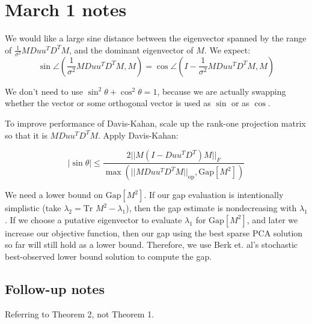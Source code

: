 \documentclass{article}
\begin{document}
\section{March 1 notes}

We would like a large sine distance between the eigenvector spanned by the range of $\frac{1}{\sigma^2} MDuu^T D^T M$, and the dominant eigenvector of $M$. We expect: $$\sin \angle(\frac{1}{\sigma^2} MDuu^T D^T M, M) = \cos \angle (I-\frac{1}{\sigma^2} MDuu^T D^T M, M)$$

We don't need to use $\sin^2\theta + \cos^2\theta = 1$, because we are actually swapping whether the vector or some orthogonal vector is used as $\sin$ or as $\cos$.

To improve performance of Davis-Kahan, scale up the rank-one projection matrix so that it is $MDuu^T D^T M$. Apply Davis-Kahan:

$$
|\sin\theta|
\le
\frac{2||M(I-Duu^TD^T)M||_F}{\max(||MDuu^TD^TM||_\text{op}, \text{Gap}[M^2])}
$$

We need a lower bound on $\text{Gap}[M^2]$. If our gap evaluation is intentionally simplistic (take $\lambda_2 = \text{Tr }M^2 - \lambda_1$), then the gap estimate is nondecreasing with $\lambda_1$. If we choose a putative eigenvector to evaluate $\lambda_1$ for $\text{Gap}[M^2]$, and later we increase our objective function, then our gap using the best sparse PCA solution so far will still hold as a lower bound. Therefore, we use Berk et. al's stochastic best-observed lower bound solution to compute the gap.

\subsection{Follow-up notes}

Referring to Theorem 2, not Theorem 1.
\end{document}
